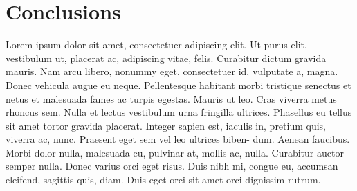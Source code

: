 \chapter{Conclusions}
Lorem ipsum dolor sit amet, consectetuer adipiscing elit. Ut purus elit, vestibulum ut,
placerat ac, adipiscing vitae, felis. Curabitur dictum gravida mauris. Nam arcu libero,
nonummy eget, consectetuer id, vulputate a, magna. Donec vehicula augue eu neque.
Pellentesque habitant morbi tristique senectus et netus et malesuada fames ac turpis
egestas. Mauris ut leo. Cras viverra metus rhoncus sem. Nulla et lectus vestibulum urna
fringilla ultrices. Phasellus eu tellus sit amet tortor gravida placerat. Integer sapien
est, iaculis in, pretium quis, viverra ac, nunc. Praesent eget sem vel leo ultrices
biben- dum. Aenean faucibus. Morbi dolor nulla, malesuada eu, pulvinar at, mollis ac,
nulla. Curabitur auctor semper nulla. Donec varius orci eget risus. Duis nibh mi,
congue eu, accumsan eleifend, sagittis quis, diam. Duis eget orci sit amet orci
dignissim rutrum.